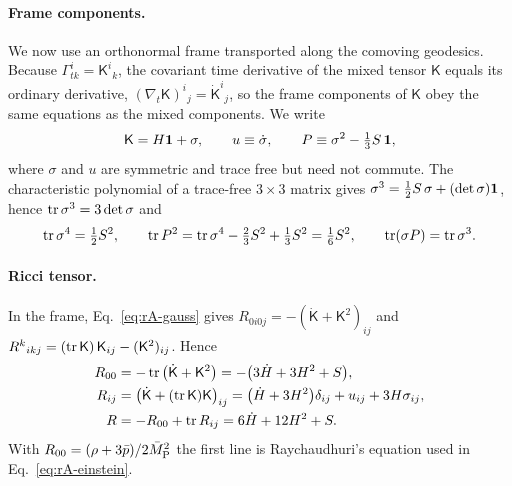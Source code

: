 \paragraph{Frame components.}
We now use an orthonormal frame transported along the comoving geodesics.
Because $\Gamma^i_{tk}=\mathsf K^i{}_k$, the covariant time derivative of the mixed tensor $\mathsf K$ equals its ordinary derivative, $(\nabla_t\mathsf K)^i{}_j=\dot{\mathsf K}^i{}_j$, so the frame components of $\mathsf K$ obey the same equations as the mixed components.
We write
\begin{equation}
\mathsf K=H\mathbf{1}+\sigma,\qquad u\equiv\dot\sigma,\qquad P\equiv\sigma^2-\tfrac13S\,\mathbf{1} ,
\label{eq:rA-uP}
\end{equation}
where $\sigma$ and $u$ are symmetric and trace free but need not commute.
The characteristic polynomial of a trace-free $3\times3$ matrix gives $\sigma^3=\tfrac12S\,\sigma+(\det\sigma)\mathbf{1}$, hence $\operatorname{tr}\sigma^3=3\det\sigma$ and
\begin{equation}
\operatorname{tr}\sigma^4=\tfrac12S^2,\qquad \operatorname{tr} P^2=\operatorname{tr}\sigma^4-\tfrac23S^2+\tfrac13S^2=\tfrac16S^2,\qquad \operatorname{tr}(\sigma P)=\operatorname{tr}\sigma^3 .
\label{eq:rA-cayley}
\end{equation}

\paragraph{Ricci tensor.}
In the frame, Eq.~\eqref{eq:rA-gauss} gives $R_{0i0j}=-(\dot{\mathsf K}+\mathsf K^2)_{ij}$ and $R^k{}_{ikj}=(\operatorname{tr}\mathsf K)\,\mathsf K_{ij}-(\mathsf K^2)_{ij}$.
Hence
\begin{equation}
\begin{aligned}
R_{00}&=-\operatorname{tr}\big(\dot{\mathsf K}+\mathsf K^2\big)=-\big(3\dot H+3H^2+S\big),\\
R_{ij}&=\big(\dot{\mathsf K}+(\operatorname{tr}\mathsf K)\mathsf K\big)_{ij}=\big(\dot H+3H^2\big)\delta_{ij}+u_{ij}+3H\sigma_{ij},\\
R&=-R_{00}+\operatorname{tr} R_{ij}=6\dot H+12H^2+S .
\end{aligned}
\label{eq:rA-ricci}
\end{equation}
With $R_{00}=(\rho+3\bar p)/2\bar M_{\mathrm{P}}^2$ the first line is Raychaudhuri's equation used in Eq.~\eqref{eq:rA-einstein}.

